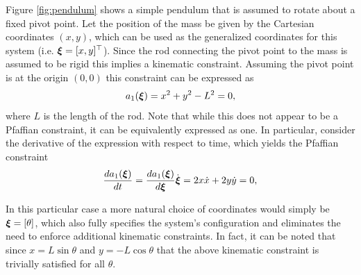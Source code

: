 \begin{example}[Pendulum] \label{ex:pendulum}
\theoremstyle{definition}
Figure \ref{fig:pendulum} shows a simple pendulum that is assumed to rotate about a fixed pivot point. Let the position of the mass be given by the Cartesian coordinates $(x,y)$, which can be used as the generalized coordinates for this system (i.e. $\bm{\xi} = [x, y]^\top $). Since the rod connecting the pivot point to the mass is assumed to be rigid this implies a kinematic constraint. Assuming the pivot point is at the origin $(0,0)$ this constraint can be expressed as
\begin{equation} \label{eq:pendholonomic}
a_1(\bm{\xi}) = x^2 + y^2 - L^2 = 0,    
\end{equation}
where $L$ is the length of the rod. Note that while this does not appear to be a Pfaffian constraint, it can be equivalently expressed as one. In particular, consider the derivative of the expression with respect to time, which yields the Pfaffian constraint
\begin{equation} \label{eq:pendpfaffian}
\frac{d a_1(\bm{\xi})}{dt} = \frac{d a_1(\bm{\xi})}{d\bm{\xi}}\dot{\bm{\xi}} = 2x\dot{x} + 2y\dot{y} = 0,
\end{equation}

In this particular case a more natural choice of coordinates would simply be $\bm{\xi} = [\theta]$, which also fully specifies the system's configuration and eliminates the need to enforce additional kinematic constraints. In fact, it can be noted that since $x = L\sin \theta$ and $y = -L \cos \theta$ that the above kinematic constraint is trivially satisfied for all $\theta$.
\end{example}

